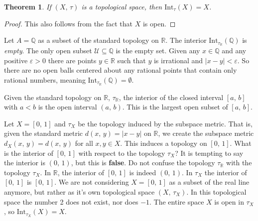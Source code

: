 \documentclass{article}
\theoremstyle{plain}
\newtheorem{theorem}{Theorem}[section]
\theoremstyle{normal}
\newenvironment{example}{%
    \pushQED{\qed}\renewcommand{\qedsymbol}{$\blacksquare$}\examplex%
}{%
    \popQED\endexamplex%
}
\begin{document}
        \begin{theorem}
            If $(X,\,\tau)$ is a topological space, then
            $\textrm{Int}_{\tau}(X)=X$.
        \end{theorem}
        \begin{proof}
            This also follows from the fact that $X$ is open.
        \end{proof}
        \begin{example}
            Let $A=\mathbb{Q}$ as a subset of the standard topology on
            $\mathbb{R}$. The interior
            $\textrm{Int}_{\tau_{\mathbb{R}}}(\mathbb{Q})$ is \textit{empty}.
            The only open subset $\mathcal{U}\subseteq\mathbb{Q}$ is the empty
            set. Given any $x\in\mathbb{Q}$ and any positive $\varepsilon>0$
            there are points $y\in\mathbb{R}$ such that $y$ is irrational
            and $|x-y|<\varepsilon$. So there are no open balls centered about
            any rational points that contain only rational numbers, meaning
            $\textrm{Int}_{\tau_{\mathbb{R}}}(\mathbb{Q})=\emptyset$.
        \end{example}
        \begin{example}
            Given the standard topology on $\mathbb{R}$, $\tau_{\mathbb{R}}$,
            the interior of the closed interval $[a,\,b]$ with
            $a<b$ is the open interval $(a,\,b)$. This is the largest open
            subset of $[a,\,b]$.
        \end{example}
        \begin{example}
            Let $X=[0,\,1]$ and $\tau_{X}$ be the topology induced by the
            subspace metric. That is, given the standard metric
            $d(x,\,y)=|x-y|$ on $\mathbb{R}$, we create the subspace metric
            $d_{X}(x,\,y)=d(x,\,y)$ for all $x,y\in{X}$. This induces a topology
            on $[0,\,1]$. What is the interior of $[0,\,1]$ with respect
            to the topology $\tau_{X}$? It is tempting to say the interior
            is $(0,\,1)$, but this is \textbf{false}. Do not confuse the
            topology $\tau_{\mathbb{R}}$ with the topology
            $\tau_{X}$. In $\mathbb{R}$, the interior of $[0,\,1]$ is indeed
            $(0,\,1)$. In $\tau_{X}$ the interior of $[0,\,1]$ is
            $[0,\,1]$. We are not considering $X=[0,\,1]$ as a subset of the
            real line anymore, but rather as it's own topological space
            $(X,\,\tau_{X})$. In this topological space the number 2 does not
            exist, nor does $-1$. The entire space $X$ is open in $\tau_{X}$,
            so $\textrm{Int}_{\tau_{X}}(X)=X$.
        \end{example}
\end{document}
